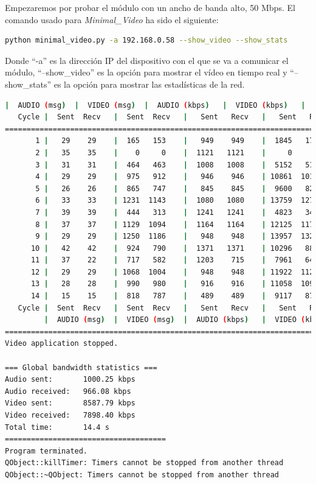 Empezaremos por probar el módulo con un ancho de banda alto, 50 Mbps. El comando usado para \textit{Minimal\_Video} ha sido el siguiente:

\begin{lstlisting}[language=bash]
python minimal_video.py -a 192.168.0.58 --show_video --show_stats
\end{lstlisting}
Donde ``-a'' es la dirección IP del dispositivo con el que se va a comunicar el módulo, ``--show\_video'' es la opción para mostrar el vídeo en tiempo real y ``--show\_stats'' es la opción para mostrar las estadísticas de la red.
\vspace{\baselineskip}

\begin{lstlisting}[language=bash,basicstyle=\ttfamily\tiny]
         |  AUDIO (msg)  |  VIDEO (msg)  |  AUDIO (kbps)   |  VIDEO (kbps)   |     CPU (%) 
   Cycle |  Sent  Recv   |  Sent  Recv   |   Sent   Recv   |   Sent   Recv   | Program System
================================================================================================
       1 |   29    29    |  165   153    |   949    949    |  1845   1713    |  16      0       
       2 |   35    35    |    0     0    |  1121   1121    |     0      0    |  45     78       
       3 |   31    31    |  464   463    |  1008   1008    |  5152   5137    |  40     71       
       4 |   29    29    |  975   912    |   946    946    | 10861  10161    |  23     76       
       5 |   26    26    |  865   747    |   845    845    |  9600   8291    |  36     66       
       6 |   33    33    | 1231  1143    |  1080   1080    | 13759  12772    |  48     74       
       7 |   39    39    |  444   313    |  1241   1241    |  4823   3402    |  49     72       
       8 |   37    37    | 1129  1094    |  1164   1164    | 12125  11749    |  41     75       
       9 |   29    29    | 1250  1186    |   948    948    | 13957  13240    |  31     78       
      10 |   42    42    |  924   790    |  1371   1371    | 10296   8803    |  36     67       
      11 |   37    22    |  717   582    |  1203    715    |  7961   6462    |  43     71       
      12 |   29    29    | 1068  1004    |   948    948    | 11922  11209    |  31     69       
      13 |   28    28    |  990   980    |   916    916    | 11058  10948    |  33     73       
      14 |   15    15    |  818   787    |   489    489    |  9117   8769    |  23     72       
   Cycle |  Sent  Recv   |  Sent  Recv   |   Sent   Recv   |   Sent   Recv   | Program System
         |  AUDIO (msg)  |  VIDEO (msg)  |  AUDIO (kbps)   |  VIDEO (kbps)   |     CPU (%) 
===========================================================================================
Video application stopped.

=== Global bandwidth statistics ===
Audio sent:       1000.25 kbps
Audio received:   966.08 kbps
Video sent:       8587.79 kbps
Video received:   7898.40 kbps
Total time:       14.4 s
=====================================
Program terminated.
QObject::killTimer: Timers cannot be stopped from another thread
QObject::~QObject: Timers cannot be stopped from another thread
\end{lstlisting}
\vspace{\baselineskip}


